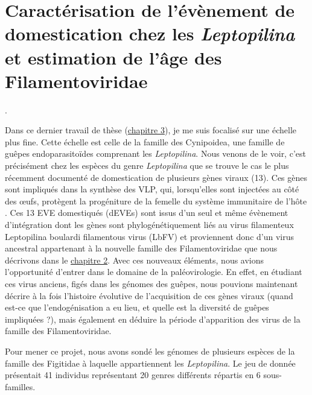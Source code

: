 \section{Caractérisation de l'évènement de domestication chez les \textit{Leptopilina} et estimation de l'âge des Filamentoviridae}.

Dans ce dernier travail de thèse (\hyperref[sec:chap1]{chapitre 3}), je me suis focalisé sur une échelle plus fine. Cette échelle est celle de la famille des Cynipoidea, une famille de guêpes endoparasitoïdes comprenant les \textit{Leptopilina}.  Nous venons de le voir, c'est précisément chez les espèces du genre \textit{Leptopilina} que se trouve le cas le plus récemment documenté de domestication de plusieurs gènes viraux (13). Ces gènes sont impliqués dans la synthèse des VLP, qui, lorsqu'elles sont injectées au côté des œufs, protègent la progéniture de la femelle du système immunitaire de l'hôte \citep{di_giovanni_behavior-manipulating_2020}. Ces 13 EVE domestiqués (dEVEs) sont issus d'un seul et même évènement d'intégration dont les gènes sont phylogénétiquement liés au virus filamenteux Leptopilina boulardi filamentous virus (LbFV) et proviennent donc d'un virus ancestral appartenant à la nouvelle famille des Filamentoviridae que nous décrivons dans le \hyperref[sec:chap1]{chapitre 2}. Avec ces nouveaux éléments, nous avions l'opportunité d'entrer dans le domaine de la paléovirologie. En effet, en étudiant ces virus anciens, figés dans les génomes des guêpes, nous pouvions maintenant décrire à la fois l'histoire évolutive de l'acquisition de ces gènes viraux (quand est-ce que l'endogénisation a eu lieu, et quelle est la diversité de guêpes impliquées ?), mais également en déduire la période d'apparition des virus de la famille des Filamentoviridae.

Pour mener ce projet, nous avons sondé les génomes de plusieurs espèces de la famille des Figitidae à laquelle appartiennent les \textit{Leptopilina}. Le jeu de donnée présentait 41 individus représentant 20 genres différents répartis en 6 sous-familles. 



